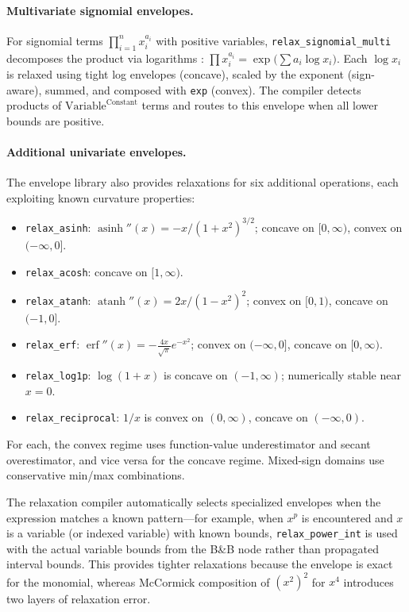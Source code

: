 \documentclass[12pt,preprint]{article}
\begin{document}
\paragraph{Multivariate signomial envelopes.}
For signomial terms $\prod_{i=1}^n x_i^{a_i}$ with positive variables, \texttt{relax\_signomial\_multi} decomposes the product via logarithms \cite{Maranas1997}:
$\prod x_i^{a_i} = \exp\!\bigl(\sum a_i \log x_i\bigr)$.
Each $\log x_i$ is relaxed using tight log envelopes (concave), scaled by the exponent (sign-aware), summed, and composed with \texttt{exp} (convex). The compiler detects products of $\text{Variable}^{\text{Constant}}$ terms and routes to this envelope when all lower bounds are positive.

\paragraph{Additional univariate envelopes.}
The envelope library also provides relaxations for six additional operations, each exploiting known curvature properties:
\begin{itemize}
\item \texttt{relax\_asinh}: $\operatorname{asinh}''(x) = -x/(1+x^2)^{3/2}$; concave on $[0,\infty)$, convex on $(-\infty,0]$.
\item \texttt{relax\_acosh}: concave on $[1,\infty)$.
\item \texttt{relax\_atanh}: $\operatorname{atanh}''(x) = 2x/(1-x^2)^2$; convex on $[0,1)$, concave on $(-1,0]$.
\item \texttt{relax\_erf}: $\operatorname{erf}''(x) = -\frac{4x}{\sqrt{\pi}} e^{-x^2}$; convex on $(-\infty,0]$, concave on $[0,\infty)$.
\item \texttt{relax\_log1p}: $\log(1+x)$ is concave on $(-1,\infty)$; numerically stable near $x=0$.
\item \texttt{relax\_reciprocal}: $1/x$ is convex on $(0,\infty)$, concave on $(-\infty,0)$.
\end{itemize}
For each, the convex regime uses function-value underestimator and secant overestimator, and vice versa for the concave regime. Mixed-sign domains use conservative min/max combinations.

The relaxation compiler automatically selects specialized envelopes when the expression matches a known pattern---for example, when $x^p$ is encountered and $x$ is a variable (or indexed variable) with known bounds, \texttt{relax\_power\_int} is used with the actual variable bounds from the B\&B node rather than propagated interval bounds. This provides tighter relaxations because the envelope is exact for the monomial, whereas McCormick composition of $(x^2)^2$ for $x^4$ introduces two layers of relaxation error.
\end{document}
